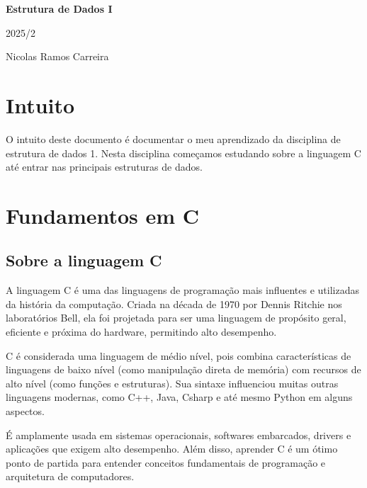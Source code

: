 \documentclass{report}
\begin{document}
	
	\begin{titlepage}
		
		\centering
		\vspace*{5cm} %
		
		{\Huge\bfseries Estrutura de Dados I\par} %
		
		\vspace{0.5cm}
		{\Large 2025/2\par} %
		
		\vfill
		{\large Nicolas Ramos Carreira\par} %
		
		\vspace*{2cm}
	\end{titlepage}
	
	\tableofcontents
	\newpage
	
	\chapter{Intuito}
	
	O intuito deste documento é documentar o meu aprendizado da disciplina de estrutura de dados 1. Nesta disciplina começamos estudando sobre a linguagem C até entrar nas principais estruturas de dados. 
	
	\chapter{Fundamentos em C}
	\section{Sobre a linguagem C}
	A linguagem C é uma das linguagens de programação mais influentes e utilizadas da história da computação. Criada na década de 1970 por Dennis Ritchie nos laboratórios Bell, ela foi projetada para ser uma linguagem de propósito geral, eficiente e próxima do hardware, permitindo alto desempenho.
	
	C é considerada uma linguagem de médio nível, pois combina características de linguagens de baixo nível (como manipulação direta de memória) com recursos de alto nível (como funções e estruturas). Sua sintaxe influenciou muitas outras linguagens modernas, como C++, Java, Csharp e até mesmo Python em alguns aspectos.
	
	É amplamente usada em sistemas operacionais, softwares embarcados, drivers e aplicações que exigem alto desempenho. Além disso, aprender C é um ótimo ponto de partida para entender conceitos fundamentais de programação e arquitetura de computadores.
\end{document}
